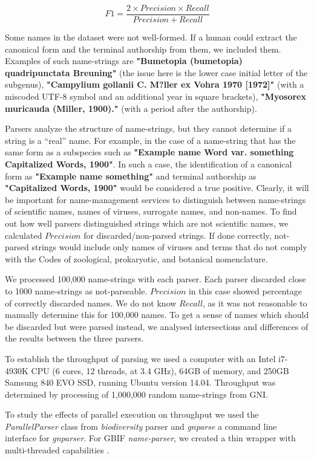 \documentclass{bmcart}
\begin{document}
\[F1 = \dfrac{2 \times Precision \times Recall}{Precision + Recall}\]


Some names in the dataset were not well-formed. If a human could extract the
canonical form and the terminal authorship from them, we included them.
Examples of such name-strings are \textbf{"Bumetopia (bumetopia) quadripunctata
Breuning"} (the issue here is the lower case initial letter of the subgenus), \textbf{"Campylium
gollanii C. M?ller ex Vohra 1970 [1972]"} (with a miscoded UTF-8 symbol and an
additional year in square brackets), \textbf{"Myosorex muricauda (Miller,
1900)."} (with a period after the authorship).

Parsers analyze the structure of name-strings, but they cannot determine if
a string is a ``real'' name. For example, in the case of a name-string that has
the same form as a subspecies such as \textbf{"Example name Word var. something
Capitalized Words, 1900"}. In such a case, the identification of a canonical
form as \textbf{"Example name something"} and terminal authorship as
\textbf{"Capitalized Words, 1900"} would be considered a true positive. Clearly, it will be important for name-management services to distinguish between name-strings of
scientific names, names of viruses, surrogate names, and non-names. To find out
how well parsers distinguished strings which are not scientific names, we
calculated $Precision$ for discarded/non-parsed strings. If done correctly,
not-parsed strings would include only names of viruses and terms that do not
comply with the Codes of zoological, prokaryotic, and botanical nomenclature.

We processed 100,000 name-strings with each parser.  Each parser discarded
close to 1000 name-strings as not-parseable.  $Precision$ in this case showed
percentage of correctly discarded names.  We do not know $Recall$, as it was
not reasonable to manually determine this for 100,000 names. To get a sense of
names which should be discarded but were parsed instead, we analysed
intersections and differences of the results between the three parsers.

To establish the throughput of parsing we used a computer with an Intel
i7-4930K CPU (6 cores, 12 threads, at 3.4 GHz), 64GB of memory, and 250GB
Samsung 840 EVO SSD, running Ubuntu version 14.04. Throughput was determined by
processing of 1,000,000 random name-strings from GNI.

To study the effects of parallel execution on throughput we used the
\textit{ParallelParser} class from \textit{biodiversity} parser and
\textit{gnparse} a command line interface for \textit{gnparser}. For GBIF
\textit{name-parser}, we created a thin wrapper with multi-threaded
capabilities \cite{gbifparser}.
\end{document}
